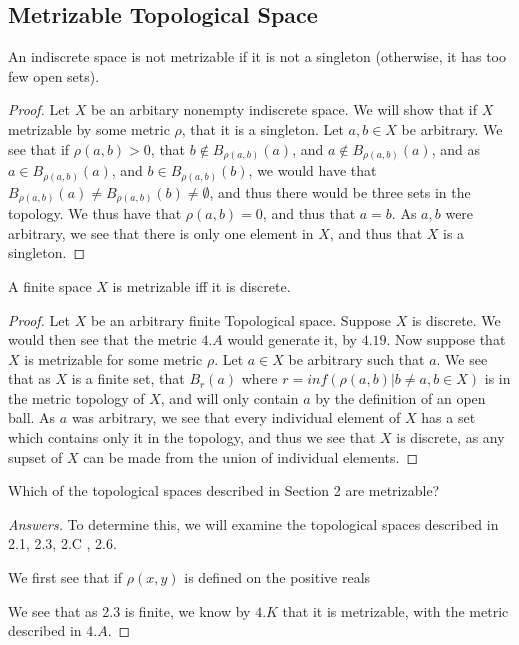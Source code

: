 \subsection{Metrizable Topological Space}

\begin{majorEx}%
    An indiscrete space is not metrizable if it is not a singleton (otherwise,
    it has too few open sets).
\end{majorEx}

\begin{proof}
   Let $X$ be an arbitary nonempty indiscrete space.
   We will show that if $X$ metrizable by some metric $\rho$, that it
   is a singleton. Let $a,b \in X$ be arbitrary. We see that if
   $\rho(a,b)>0$, that $b \notin B_{\rho(a,b)}(a)$, and $a \notin
   B_{\rho(a,b)}(a)$, and as $a \in B_{\rho(a,b)}(a)$, and $b \in
   B_{\rho(a,b)}(b)$, we would have that $B_{\rho(a,b)}(a)\neq
   B_{\rho(a,b)}(b)\neq \emptyset$, and thus there would be three sets
   in the topology. We thus have that $\rho(a,b)=0$, and thus that
   $a=b$. As $a,b$ were arbitrary, we see that there is only one
   element in $X$, and thus that $X$ is a singleton.
\end{proof}

\begin{majorEx}%
    A finite space $X$ is metrizable iff it is discrete.
\end{majorEx}

\begin{proof}
  Let $X$ be an arbitrary finite Topological space. Suppose $X$ is
  discrete. We would then see that the metric $4.A$ would generate it,
  by $4.19$. Now suppose that $X$ is metrizable for some metric
  $\rho$. Let $a\in X$ be 
  arbitrary such that $a$. We see that as $X$ is a finite set, that
  $B_r(a)$ where $r = inf (\rho(a,b)| b\neq a, b\in X )$ is in the
  metric topology of $X$, and will only contain $a$ by the definition
  of an open ball. As $a$ was arbitrary, we see that every individual
  element of $X$ has a set which contains only it in the topology, and
  thus we see that $X$ is discrete, as any supset of $X$ can be made
  from the union of individual elements.
\end{proof}


\begin{minorEx}%
    Which of the topological spaces described in Section 2 are metrizable?
\end{minorEx}


\begin{proof}[Answers]
  To determine this, we will examine the topological spaces described
  in 2.1, 2.3, 2.C , 2.6.

  We first see that if $\rho(x,y)$ is defined on the positive reals

  We see that as 2.3 is finite, we know by $4.K$ that it is
  metrizable, with the metric described in $4.A$.
\end{proof}